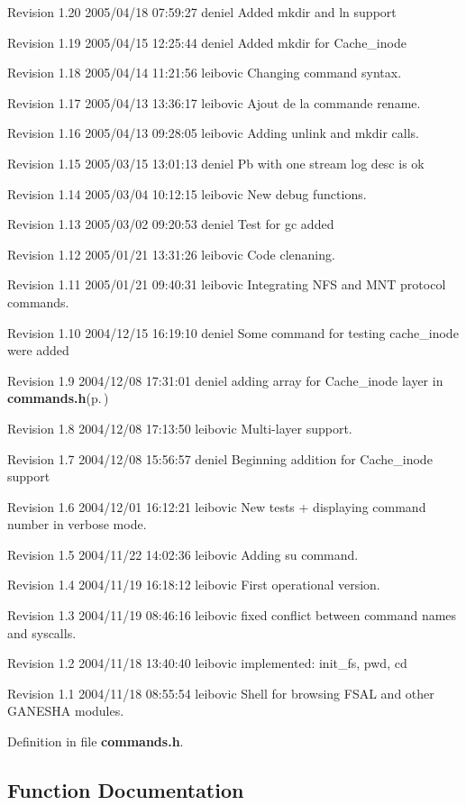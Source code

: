 Revision 1.20 2005/04/18 07:59:27 deniel Added mkdir and ln support

Revision 1.19 2005/04/15 12:25:44 deniel Added mkdir for Cache\_\-inode

Revision 1.18 2005/04/14 11:21:56 leibovic Changing command syntax.

Revision 1.17 2005/04/13 13:36:17 leibovic Ajout de la commande rename.

Revision 1.16 2005/04/13 09:28:05 leibovic Adding unlink and mkdir calls.

Revision 1.15 2005/03/15 13:01:13 deniel Pb with one stream log desc is ok

Revision 1.14 2005/03/04 10:12:15 leibovic New debug functions.

Revision 1.13 2005/03/02 09:20:53 deniel Test for gc added

Revision 1.12 2005/01/21 13:31:26 leibovic Code clenaning.

Revision 1.11 2005/01/21 09:40:31 leibovic Integrating NFS and MNT protocol commands.

Revision 1.10 2004/12/15 16:19:10 deniel Some command for testing cache\_\-inode were added

Revision 1.9 2004/12/08 17:31:01 deniel adding array for Cache\_\-inode layer in {\bf commands.h}{\rm (p.\,\pageref{commands_8h})}

Revision 1.8 2004/12/08 17:13:50 leibovic Multi-layer support.

Revision 1.7 2004/12/08 15:56:57 deniel Beginning addition for Cache\_\-inode support

Revision 1.6 2004/12/01 16:12:21 leibovic New tests + displaying command number in verbose mode.

Revision 1.5 2004/11/22 14:02:36 leibovic Adding su command.

Revision 1.4 2004/11/19 16:18:12 leibovic First operational version.

Revision 1.3 2004/11/19 08:46:16 leibovic fixed conflict between command names and syscalls.

Revision 1.2 2004/11/18 13:40:40 leibovic implemented: init\_\-fs, pwd, cd

Revision 1.1 2004/11/18 08:55:54 leibovic Shell for browsing FSAL and other GANESHA modules.

Definition in file {\bf commands.h}.

\subsection{Function Documentation}
